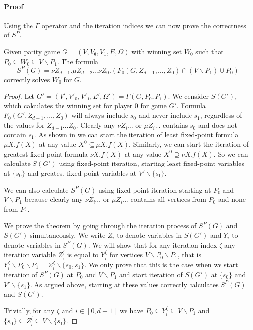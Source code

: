 \paragraph{Proof}
Using the $\Gamma$ operator and the iteration indices we can now prove the correctness of $S^P$.
\begin{theorem}
	\label{the_formula_cupP0_etc_is_correct}
	Given parity game $G = (V,V_0,V_1,E,\Omega)$ with winning set $W_0$ such that $P_0\subseteq W_0 \subseteq V\backslash P_1$. The formula 
	\[ S^P(G) = \nu Z_{d-1}.\mu Z_{d-2}\dots \nu Z_0.(F_0(G,Z_{d-1},\dots,Z_0) \cap (V\backslash P_1) \cup P_0) \]
	correctly solves $W_0$ for $G$.
	\begin{proof}
		Let $G' = (V',V'_0,V'_1,E',\Omega') = \Gamma(G,P_0,P_1)$. We consider $S(G')$, which calculates the winning set for player $0$ for game $G'$. Formula $F_0(G',Z_{d-1},\dots,Z_0)$ will always include $s_0$ and never include $s_1$, regardless of the values for $Z_{d-1} \dots Z_0$. Clearly any $\nu Z_i\dots$ or $\mu Z_i\dots$ contains $s_0$ and does not contain $s_1$. As shown in \cite{Emerson:1986:MCP:900378} we can start the iteration of least fixed-point formula $\mu X.f(X)$ at any value $X^0 \subseteq \mu  X.f(X)$. Similarly, we can start the iteration of greatest fixed-point formula $\nu X.f(X)$ at any value $X^0 \supseteq \nu X.f(X)$. So we can calculate $S(G')$ using fixed-point iteration, starting least fixed-point variables at $\{s_0\}$ and greatest fixed-point variables at $V'\backslash \{s_1\}$.
		
		We can also calculate $S^P(G)$ using fixed-point iteration starting at $P_0$ and $V\backslash P_1$ because clearly any $\nu Z_i \dots$ or $\mu Z_i\dots$ contains all vertices from $P_0$ and none from $P_1$.
		
		We prove the theorem by going through the iteration process of $S^P(G)$ and $S(G')$ simultaneously. We write $Z_i$ to denote variables in $S(G')$ and $Y_i$ to denote variables in $S^P(G)$. We will show that for any iteration index $\zeta$ any iteration variable $Z_i^\zeta$ is equal to $Y_i^\zeta$ for vertices $V\backslash P_0 \backslash P_1$, that is $Y_i^\zeta\backslash P_0 \backslash P_1 = Z_i^\zeta \backslash \{s_0,s_1\}$. We only prove that this is the case when we start iteration of $ S^P(G)$ at $P_0$ and $V\backslash P_1$ and start iteration of $S(G')$ at $\{s_0\}$ and $V'\backslash \{s_1\}$. As argued above, starting at these values correctly calculates $S^P(G)$ and $S(G')$.
		
		Trivially, for any $\zeta$ and $i \in [0,d-1]$ we have $P_0 \subseteq Y_i^{\zeta} \subseteq V\backslash P_1$ and $\{s_0\} \subseteq Z_i^\zeta\subseteq V\backslash \{s_1\}$.
		

\end{proof}
\end{theorem}
